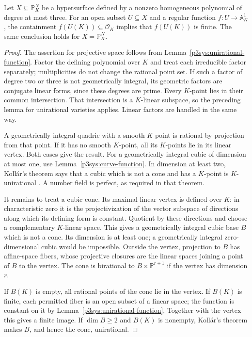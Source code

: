\begin{lemma}\label{p3sys:cubic-function}
Let $X\subseteq\mathbb P^N_K$ be a hypersurface defined by a
nonzero homogeneous polynomial of degree at most three.  For an open
subset $U\subseteq X$ and a regular function
$f:U\to\mathbb A^1_K$, the containment
$f(U(K))\subseteq\mathcal O_K$ implies that $f(U(K))$ is finite.
The same conclusion holds for $X=\mathbb P^N_K$.
\end{lemma}
\begin{proof}
The assertion for projective space follows from
Lemma~\ref{p3sys:unirational-function}.  Factor the defining
polynomial over $K$ and treat each irreducible factor separately;
multiplicities do not change the rational point set.  If such a
factor of degree two or three is not geometrically integral, its
geometric factors are conjugate linear forms, since these degrees
are prime.  Every $K$-point lies in their common intersection.
That intersection is a $K$-linear subspace, so the preceding lemma
for unirational varieties applies.  Linear factors are handled in
the same way.

A geometrically integral quadric with a smooth $K$-point is rational
by projection from that point.  If it has no smooth $K$-point, all
its $K$-points lie in its linear vertex.  Both cases give the result.
For a geometrically integral cubic of dimension at most one, use
Lemma~\ref{p3sys:curve-function}.  In dimension at least two,
Koll\'ar's theorem says that a cubic which is not a cone and has
a $K$-point is $K$-unirational
\cite[Theorem~2]{lbKollar2002}.  A number field is perfect,
as required in that theorem.

It remains to treat a cubic cone.  Its maximal linear vertex is
defined over $K$: in characteristic zero it is the projectivization
of the vector subspace of directions along which its defining form
is constant.  Quotient by these directions and choose a complementary
$K$-linear space.  This gives a geometrically integral cubic base
$B$ which is not a cone.  Its dimension is at least one; a
geometrically integral zero-dimensional cubic would be impossible.
Outside the vertex, projection to $B$ has affine-space fibers, whose
projective closures are the linear spaces joining a point of $B$
to the vertex.  The cone is birational to
$B\times\mathbb P^{r+1}$ if the vertex has dimension $r$.

If $B(K)$ is empty, all rational points of the cone lie in the
vertex.  If $B(K)$ is finite, each permitted fiber is an open
subset of a linear space; the function is constant on it by
Lemma~\ref{p3sys:unirational-function}.  Together with the vertex
this gives a finite image.  If $\dim B\ge2$ and $B(K)$ is
nonempty, Koll\'ar's theorem makes $B$, and hence the cone,
unirational.


\end{proof}
